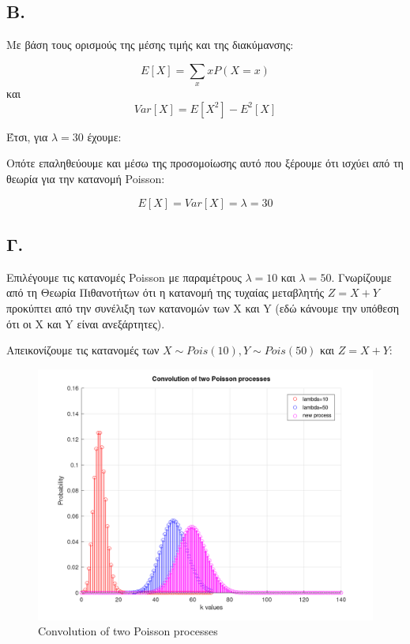 \documentclass[a4paper]{article}
\begin{document}
\subsection*{Β.}

Με βάση τους ορισμούς της μέσης τιμής και της διακύμανσης:

\[
	E[X]=\sum_x x P(X=x)
\]
και 
\[
	Var[X] = Ε[X^2]-Ε^2[X]
\]

Έτσι, για $ λ = 30 $ έχουμε:



Οπότε επαληθεύουμε και μέσω της προσομοίωσης αυτό που ξέρουμε ότι ισχύει από τη θεωρία για την κατανομή Poisson: 

\[ 
	{Ε[X] = Var[X] = λ = 30} 
\]


\subsection*{Γ.}

Επιλέγουμε τις κατανομές Poisson με παραμέτρους $ λ = 10 $ και $ λ = 50 $. Γνωρίζουμε από τη Θεωρία Πιθανοτήτων ότι η κατανομή της τυχαίας μεταβλητής $ {Z = X + Y} $ προκύπτει από την συνέλιξη των κατανομών των X και Y (εδώ κάνουμε την υπόθεση ότι οι X και Y είναι ανεξάρτητες). 

Απεικονίζουμε τις κατανομές των $ X\sim Pois(10), Y \sim Pois(50) $ και $ {Z = X + Y }$:

\begin{figure}[H]
	\includegraphics[width=\textwidth]{../images/Poisson_Distribution_C.png}
	\caption{Convolution of two Poisson processes}
	\label{fig:Poisson Distribution C}
\end{figure}
\end{document}
